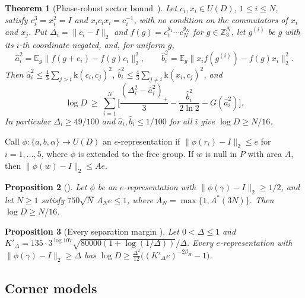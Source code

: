 \documentclass[11pt,a4paper]{article}
\theoremstyle{plain}
\newtheorem{theorem}{Theorem}[section]
\newtheorem{proposition}[theorem]{Proposition}
\theoremstyle{definition}
\theoremstyle{remark}
\begin{document}
\begin{theorem}[Phase-robust sector bound~{\cite[Theorem~4.4]{DouglasMghirbiA}}]\label{thm:phase-robust}
Let $c_i,x_i\in U(D)$, $1\le i\le N$, satisfy $c_i^3=x_i^2=I$ and $x_ic_ix_i=c_i^{-1}$, with no condition on the commutators of
$x_i$ and $x_j$. Put $\Delta_i=\|c_i-I\|_2$ and $f(g)=c_1^{g_1}\cdots c_N^{g_N}$ for $g\in\mathbb Z_3^N$, let $g^{(i)}$ be $g$ with its
$i$-th coordinate negated, and, for uniform $g$,
\[
\hat a_i^2=\mathbb E_g\|f(g+e_i)-f(g)c_i\|_2^2,\qquad \hat b_i^2=\mathbb E_g\|x_if(g^{(i)})-f(g)x_i\|_2^2 .
\]
Then $\hat a_i^2\le\frac43\sum_{j>i}\mathrm{k}(c_i,c_j)^2$, $\hat b_i^2\le\frac43\sum_{j\ne i}\mathrm{k}(x_i,c_j)^2$, and
\[
\log D\ \ge\ \sum_{i=1}^N\Big[\frac{(\Delta_i^2-\hat a_i^2)_+}3-\frac{\hat b_i^2}{2\ln2}-G(\hat a_i^2)\Big].
\]
In particular $\Delta_i\ge49/100$ and $\hat a_i,\hat b_i\le1/100$ for all $i$ give $\log D\ge N/16$.
\end{theorem}

Call $\phi:\{a,b,\alpha\}\to U(D)$ an $e$-representation if $\|\phi(r_i)-I\|_2\le e$ for $i=1,\dots,5$, where $\phi$ is extended to the
free group. If $w$ is null in $P$ with area $A$, then $\|\phi(w)-I\|_2\le Ae$.

\begin{proposition}[{\cite[Proposition~4.5]{DouglasMghirbiA}}]\label{prop:dimension}
Let $\phi$ be an $e$-representation with $\|\phi(\gamma)-I\|_2\ge1/2$, and let $N\ge1$ satisfy $750\sqrt N\,A_Ne\le1$, where
$A_N=\max\{1,A^*(3N)\}$. Then $\log D\ge N/16$.
\end{proposition}

\begin{proposition}[Every separation margin {\cite[Proposition~4.6]{DouglasMghirbiA}}]\label{prop:margin-import}
Let $0<\Delta\le1$ and $K'_\Delta=135\cdot3^{\log107}\sqrt{80000(1+\log(1/\Delta))}/\Delta$. Every $e$-representation with
$\|\phi(\gamma)-I\|_2\ge\Delta$ has $\log D\ge\frac{\Delta^2}{12}\bigl((K'_\Delta e)^{-2\beta_H}-1\bigr)$.
\end{proposition}

\subsection{Corner models}\label{sec:corner}
\end{document}
